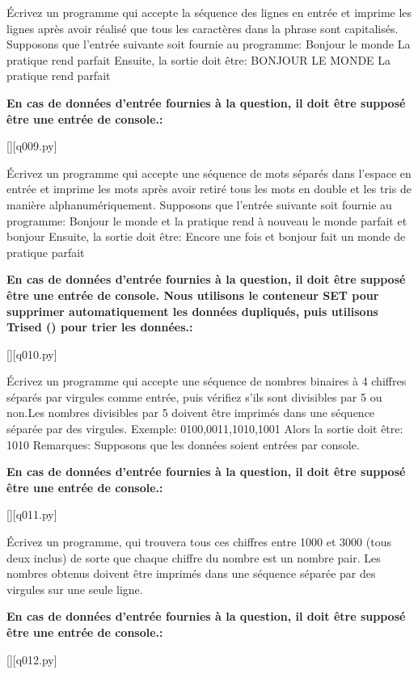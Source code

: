 \question
Écrivez un programme qui accepte la séquence des lignes en entrée et imprime les lignes après avoir réalisé que tous les caractères dans la phrase sont capitalisés.
Supposons que l'entrée suivante soit fournie au programme:
Bonjour le monde
La pratique rend parfait
Ensuite, la sortie doit être:
BONJOUR LE MONDE
La pratique rend parfait
\par
\textbf{En cas de données d'entrée fournies à la question, il doit être supposé être une entrée de console.:}
\renewcommand{\nomfichier}{q009.py}
\begin{solution}
    \pythonfile{\chemincode \nomfichier}[][q009.py]
\end{solution}


\question
Écrivez un programme qui accepte une séquence de mots séparés dans l'espace en entrée et imprime les mots après avoir retiré tous les mots en double et les tris de manière alphanumériquement.
Supposons que l'entrée suivante soit fournie au programme:
Bonjour le monde et la pratique rend à nouveau le monde parfait et bonjour
Ensuite, la sortie doit être:
Encore une fois et bonjour fait un monde de pratique parfait
\par
\textbf{En cas de données d'entrée fournies à la question, il doit être supposé être une entrée de console.
Nous utilisons le conteneur SET pour supprimer automatiquement les données dupliqués, puis utilisons Trised () pour trier les données.:}
\renewcommand{\nomfichier}{q010.py}
\begin{solution}
    \pythonfile{\chemincode \nomfichier}[][q010.py]
\end{solution}


\question
Écrivez un programme qui accepte une séquence de nombres binaires à 4 chiffres séparés par virgules comme entrée, puis vérifiez s'ils sont divisibles par 5 ou non.Les nombres divisibles par 5 doivent être imprimés dans une séquence séparée par des virgules.
Exemple:
0100,0011,1010,1001
Alors la sortie doit être:
1010
Remarques: Supposons que les données soient entrées par console.
\par
\textbf{En cas de données d'entrée fournies à la question, il doit être supposé être une entrée de console.:}
\renewcommand{\nomfichier}{q011.py}
\begin{solution}
    \pythonfile{\chemincode \nomfichier}[][q011.py]
\end{solution}


\question
Écrivez un programme, qui trouvera tous ces chiffres entre 1000 et 3000 (tous deux inclus) de sorte que chaque chiffre du nombre est un nombre pair.
Les nombres obtenus doivent être imprimés dans une séquence séparée par des virgules sur une seule ligne.
\par
\textbf{En cas de données d'entrée fournies à la question, il doit être supposé être une entrée de console.:}
\renewcommand{\nomfichier}{q012.py}
\begin{solution}
    \pythonfile{\chemincode \nomfichier}[][q012.py]
\end{solution}


